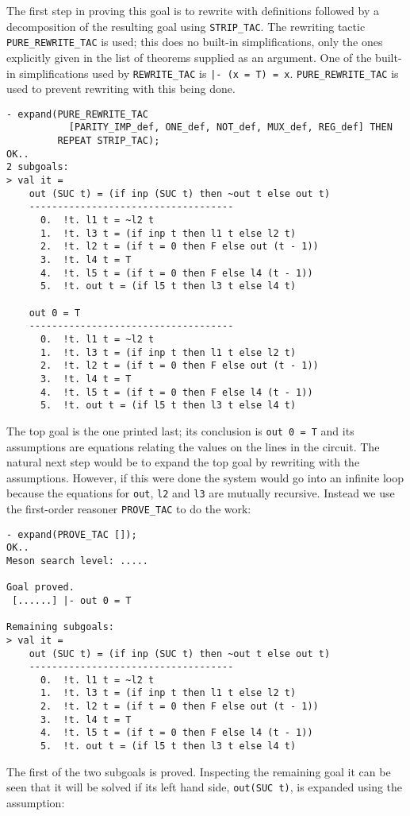 The first step in proving this goal is to rewrite with definitions
followed by a decomposition of the resulting goal using
{\small\verb|STRIP_TAC|}. The rewriting tactic
{\small\verb|PURE_REWRITE_TAC|} is used; this does no built-in
simplifications, only the ones explicitly given in the list of
theorems supplied as an argument.  One of the built-in simplifications
used by {\small\verb|REWRITE_TAC|} is {\small\tt |-~(x~=~T)~=~x}.
{\small\verb|PURE_REWRITE_TAC|} is used to prevent rewriting with this
being done.
\begin{session}
\begin{verbatim}
- expand(PURE_REWRITE_TAC
           [PARITY_IMP_def, ONE_def, NOT_def, MUX_def, REG_def] THEN
         REPEAT STRIP_TAC);
OK..
2 subgoals:
> val it =
    out (SUC t) = (if inp (SUC t) then ~out t else out t)
    ------------------------------------
      0.  !t. l1 t = ~l2 t
      1.  !t. l3 t = (if inp t then l1 t else l2 t)
      2.  !t. l2 t = (if t = 0 then F else out (t - 1))
      3.  !t. l4 t = T
      4.  !t. l5 t = (if t = 0 then F else l4 (t - 1))
      5.  !t. out t = (if l5 t then l3 t else l4 t)

    out 0 = T
    ------------------------------------
      0.  !t. l1 t = ~l2 t
      1.  !t. l3 t = (if inp t then l1 t else l2 t)
      2.  !t. l2 t = (if t = 0 then F else out (t - 1))
      3.  !t. l4 t = T
      4.  !t. l5 t = (if t = 0 then F else l4 (t - 1))
      5.  !t. out t = (if l5 t then l3 t else l4 t)
\end{verbatim}
\end{session}

The top goal is the one printed last; its conclusion is
{\small\verb|out 0 = T|} and its assumptions are equations relating
the values on the lines in the circuit.  The natural next step would
be to expand the top goal by rewriting with the assumptions.  However,
if this were done the system would go into an infinite loop because
the equations for {\small\verb|out|}, {\small\verb|l2|} and
{\small\verb|l3|} are mutually recursive.  Instead we use the
first-order reasoner {\small\verb|PROVE_TAC|} to do the work:

\begin{session}
\begin{verbatim}
- expand(PROVE_TAC []);
OK..
Meson search level: .....

Goal proved.
 [......] |- out 0 = T

Remaining subgoals:
> val it =
    out (SUC t) = (if inp (SUC t) then ~out t else out t)
    ------------------------------------
      0.  !t. l1 t = ~l2 t
      1.  !t. l3 t = (if inp t then l1 t else l2 t)
      2.  !t. l2 t = (if t = 0 then F else out (t - 1))
      3.  !t. l4 t = T
      4.  !t. l5 t = (if t = 0 then F else l4 (t - 1))
      5.  !t. out t = (if l5 t then l3 t else l4 t)
\end{verbatim}
\end{session}
The first of the two subgoals is proved.  Inspecting the remaining
goal it can be seen that it will be solved if its left hand side,
{\small\verb|out(SUC t)|}, is expanded using the assumption:

